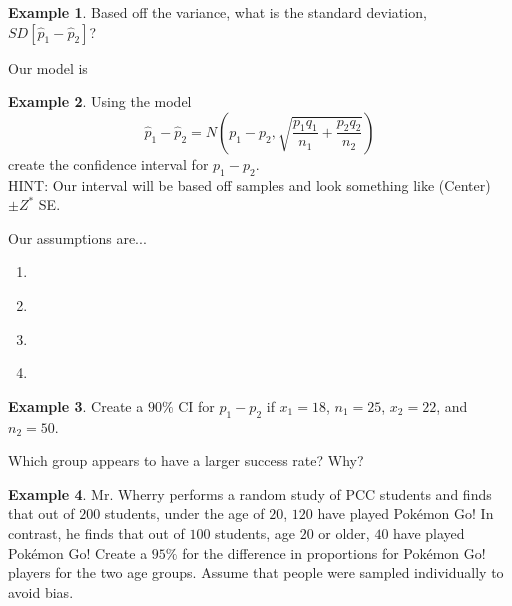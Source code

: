 \documentclass[12pt]{amsart}
\theoremstyle{definition}
\newtheorem{ex}{Example}
\begin{document}
\begin{ex}Based off the variance, what is the standard deviation, $SD[\hat{p}_1-\hat{p}_2]$?
\end{ex}
\vspace{0.5in}
\begin{framed}
 Our model is
 
 \vspace{0.75in}
 
\end{framed}

\newpage
\begin{ex}
Using the model $$\hat{p}_1-\hat{p}_2=N\left( p_1-p_2, \sqrt{\frac{p_1q_1}{n_1}+\frac{p_2q_2}{n_2}}\right)$$ create the confidence interval for $p_1-p_2$.\\
HINT: Our interval will be based off samples and look something like (Center)$\pm Z^*$ SE.
\end{ex}

\vspace{1in}

Our assumptions are...
\begin{enumerate}
 \item \,
 \item \,
 \item \, 
 \item \,
 \vspace{1in}
\end{enumerate}

\begin{ex} Create a $90\%$ CI for $p_1-p_2$ if $x_1=18$, $n_1=25$, $x_2=22$, and $n_2=50$.
\end{ex}

\vspace{2in}

Which group appears to have a larger success rate? Why?

\vspace{.25in}

\newpage
\begin{ex} Mr. Wherry performs a random study of PCC students and finds that out of $200$ students, under the age of $20$, $120$ have played Pok\'{e}mon Go! In contrast, he finds that out of $100$ students, age $20$ or older, $40$ have played Pok\'{e}mon Go!
 Create a $95\%$ for the difference in proportions for Pok\'{e}mon Go! players for the two age groups. Assume that people were sampled individually to avoid bias.\end{ex}
 
 \vfill
 
\end{document}

